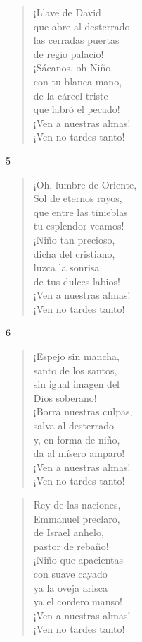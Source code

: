 \documentclass[spanish,utf8,twocolumn]{chlart}
\newenvironment{gozo}{\begin{verse}\color{lector}}{\end{verse}}
\newcommand*\vena{{\color{responden}\hspace{1em}¡Ven a nuestras almas!\\\hspace{1em}¡Ven no tardes tanto!}}
\begin{document}
\begin{gozo}
¡Llave de David\\
que abre al desterrado\\
las cerradas puertas\\
de regio palacio!\\
¡Sácanos, oh Niño,\\
con tu blanca mano,\\
de la cárcel triste\\
que labró el pecado!\\
\vena
\end{gozo}

5
\begin{gozo}
¡Oh, lumbre de Oriente,\\
Sol de eternos rayos,\\
que entre las tinieblas\\
tu esplendor veamos!\\
¡Niño tan precioso,\\
dicha del cristiano,\\
luzca la sonrisa\\
de tus dulces labios!\\
\vena
\end{gozo}

6
\begin{gozo}
¡Espejo sin mancha,\\
santo de los santos,\\
sin igual imagen del\\
Dios soberano!\\
¡Borra nuestras culpas,\\
salva al desterrado\\
y, en forma de niño,\\
da al mísero amparo!\\
\vena
\end{gozo}

\begin{gozo}
Rey de las naciones,\\
Emmanuel preclaro,\\
de Israel anhelo,\\
pastor de rebaño!\\
¡Niño que apacientas\\
con suave cayado\\
ya la oveja arisca\\
ya el cordero manso!\\
\vena
\end{gozo}
\end{document}
